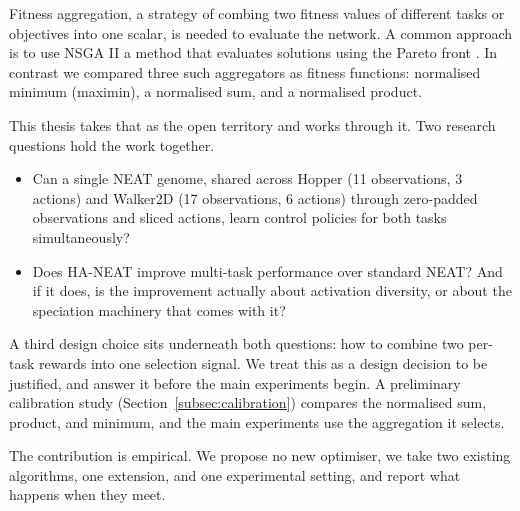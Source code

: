 \documentclass[12pt]{article}
\begin{document}
Fitness aggregation, a strategy of combing two fitness values of different tasks or objectives into one scalar, is needed to evaluate the network. 
A common approach is to use NSGA II a method that evaluates solutions using the Pareto front \parencite{deb_fast_2002}.
In contrast we compared three such aggregators as fitness functions:  normalised minimum (maximin), a normalised sum, and a normalised product.



This thesis takes that as the open territory and works through it.
Two research questions hold the work together.
\begin{itemize}
    \item Can a single NEAT genome, shared across Hopper (11 observations, 3 actions) and Walker2D (17 observations, 6 actions) through zero-padded observations and sliced actions, learn control policies for both tasks simultaneously?
    \item Does HA-NEAT improve multi-task performance over standard NEAT? And if it does, is the improvement actually about activation diversity, or about the speciation machinery that comes with it?
\end{itemize}
A third design choice sits underneath both questions: how to combine two per-task rewards into one selection signal.
We treat this as a design decision to be justified, and answer it before the main experiments begin.
A preliminary calibration study (Section~\ref{subsec:calibration}) compares the normalised sum, product, and minimum, and the main experiments use the aggregation it selects.

The contribution is empirical.
We propose no new optimiser, we take two existing algorithms, one extension, and one experimental setting, and report what happens when they meet.
\end{document}
